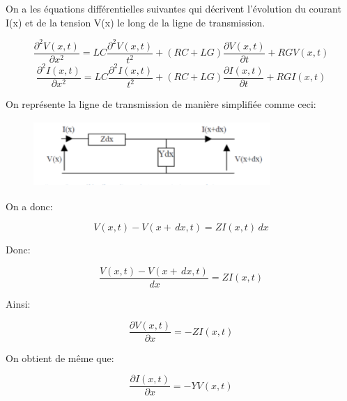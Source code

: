 \documentclass[12pt,a4paper, french]{article}
\begin{document}
     On a les équations différentielles suivantes qui décrivent l'évolution du courant I(x) et de la tension V(x) le long de la ligne de transmission. 
    \begin{center}
    \begin{equation*}
    \frac{\partial^2V(x,t)}{\partial x^{2}}=LC\frac{\partial^2V(x,t)}{t^2}+(RC+LG)\frac{\partial V(x,t)}{\partial t}+RGV(x,t)
    \end{equation*}
    \begin{equation*}
    \frac{\partial^2I(x,t)}{\partial x^{2}}=LC\frac{\partial^2I(x,t)}{t^2}+(RC+LG)\frac{\partial I(x,t)}{\partial t}+RGI(x,t)
    \end{equation*}
    \end{center}
    
     On représente la ligne de transmission de manière simplifiée comme ceci:
    \begin{figure}[!h]
        \begin{center}
            \includegraphics[width=9cm,height=2.5cm]{schemacoax.png}
        \end{center}
    \end{figure}
    On a donc: 
    \begin{center}
    \begin{equation*}
     V(x,t)-V(x+\,dx,t)=ZI(x,t)\,dx
    \end{equation*}
    \end{center}
    
    Donc:
    \begin{center}
        \begin{equation*}
         \frac{V(x,t)-V(x+\,dx,t)}{\,dx}=ZI(x,t)
    \end{equation*}
    \end{center}
    
    Ainsi:
    \begin{center}
    \begin{equation*}
         \frac{\partial V(x,t)}{\partial x}=-ZI(x,t)
    \end{equation*}
    \end{center}
    
    On obtient de même que:
    \begin{center}
    \begin{equation*}
         \frac{\partial I(x,t)}{\partial x}=-YV(x,t)
    \end{equation*}
    \end{center}
    
\end{document}
